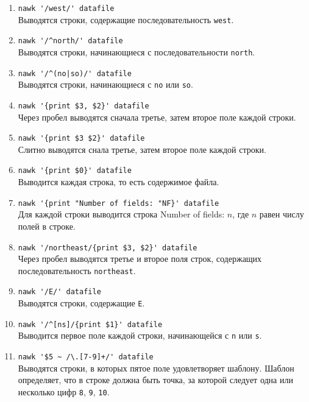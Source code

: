 \documentclass[listings]{labreport}
\begin{document}
\begin{enumerate}
\item \verb|nawk '/west/' datafile|\\
Выводятся строки, содержащие последовательность \verb|west|.

\item \verb|nawk '/^north/' datafile|\\
Выводятся строки, начинающиеся с последовательности \verb|north|.

\item \verb-nawk '/^(no|so)/' datafile-\\
Выводятся строки, начинающиеся с \verb|no| или \verb|so|.

\item \verb|nawk '{print $3, $2}' datafile|\\
Через пробел выводятся сначала третье, затем второе поле каждой строки.

\item \verb|nawk '{print $3 $2}' datafile|\\
Слитно выводятся снала третье, затем второе поле каждой строки.

\item \verb|nawk '{print $0}' datafile|\\
Выводится каждая строка, то есть содержимое файла.

\item \verb|nawk '{print "Number of fields: "NF}' datafile|\\
Для каждой строки выводится строка Number of fields: $n$, где $n$ равен числу полей в строке.

\item \verb|nawk '/northeast/{print $3, $2}' datafile|\\
Через пробел выводятся третье и второе поля строк, содержащих последовательность \verb|northeast|.

\item \verb|nawk '/E/' datafile|\\
Выводятся строки, содержащие \verb|E|.

\item \verb|nawk '/^[ns]/{print $1}' datafile|\\
Выводится первое поле каждой строки, начинающейся с \verb|n| или \verb|s|.

\item \verb|nawk '$5 ~ /\.[7-9]+/' datafile|\\
Выводятся строки, в которых пятое поле удовлетворяет шаблону. Шаблон определяет, что
в строке должна быть точка, за которой следует одна или несколько цифр \verb|8|, \verb|9|, \verb|10|.


\end{enumerate}
\end{document}
